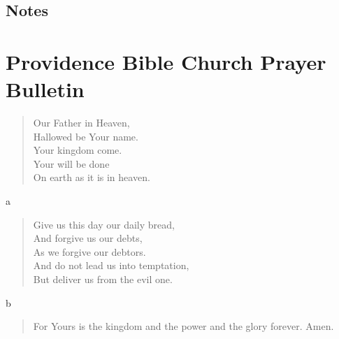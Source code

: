 \documentclass[twocolumn]{article}
\newcommand{\B}{\begin{description}}
\newcommand{\I}[1]{\item[#1]}
\newcommand{\E}{\end{description}}
\newcommand{\Q}[1]{\parbox{\columnwidth}{\begin{quote} #1 \end{quote}}}
\begin{document}
\subsection*{Notes}
\pagebreak
\section*{Providence Bible Church Prayer Bulletin}
\Q{ Our Father in Heaven, \\
    Hallowed be Your name. \\
    Your kingdom come. \\
    Your will be done \\
    On earth as it is in heaven.} 
\B
\I  a
\E
\Q{ Give us this day our daily bread, \\
    And forgive us our debts, \\
    As we forgive our debtors. \\
    And do not lead us into temptation, \\
    But deliver us from the evil one.}
\B
\I b
\E
\Q{ For Yours is the kingdom and the power and the glory forever. Amen.}
\end{document}
